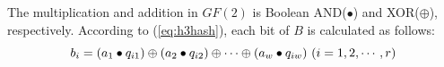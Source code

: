 \documentclass[10pt,journal,compsoc]{IEEEtran}
\begin{document}
The multiplication and addition in $GF(2)$ is Boolean AND($\bullet$) and XOR($\oplus$), respectively. According to (\ref{eq:h3hash}), each bit of $B$ is calculated as follows:
\begin{equation}
\footnotesize
{b_i} = \left( {{a_1} \bullet {q_{i1}}} \right) \oplus \left( {{a_2} \bullet {q_{i2}}} \right) \oplus  \cdots  \oplus \left( {{a_w} \bullet {q_{iw}}} \right){\rm{   }}\left( {i = 1,2, \cdots ,r} \right)
\label{eq:h3hashbit}
\end{equation}
\end{document}
